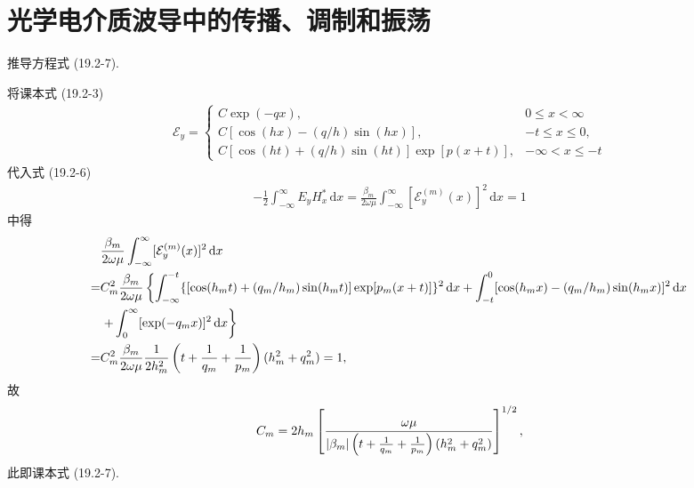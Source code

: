 \documentclass{note}
\begin{document}
\fi
\setcounter{chapter}{14}
\chapter{光学电介质波导中的传播、调制和振荡}
\begin{exe}
    推导方程式 (19.2-7).
\end{exe}
\begin{pf}
    将课本式 (19.2-3)
    \begin{align}
        \mathcal{E}_y=\left\{\begin{array}{ll}
            C\exp(-qx),&0\leq x<\infty\\
            C[\cos(hx)-(q/h)\sin(hx)],&-t\leq x\leq 0,\\
            C[\cos(ht)+(q/h)\sin(ht)]\exp[p(x+t)],&-\infty<x\leq-t
        \end{array}\right.
    \end{align}
    代入式 (19.2-6)
    \begin{align}
        -\frac{1}{2}\int_{-\infty}^{\infty}E_yH_x^*\,\mathrm{d}x=\frac{\beta_m}{2\omega\mu}\int_{-\infty}^{\infty}[\mathcal{E}_y^{(m)}(x)]^2\,\mathrm{d}x=1
    \end{align}
    中得
    \begin{align}
        \notag&\frac{\beta_m}{2\omega\mu}\int_{-\infty}^{\infty}[\mathcal{E}_y^{(m)}(x)]^2\,\mathrm{d}x\\
        \notag=&C_m^2\frac{\beta_m}{2\omega\mu}\left\{\int_{-\infty}^{-t}\{[\cos(h_mt)+(q_m/h_m)\sin(h_mt)]\exp[p_m(x+t)]\}^2\,\mathrm{d}x+\int_{-t}^0[\cos(h_mx)-(q_m/h_m)\sin(h_mx)]^2\,\mathrm{d}x\right.\\
        \notag&\left.+\int_0^{\infty}[\exp(-q_mx)]^2\,\mathrm{d}x\right\}\\
        \notag=&C_m^2\frac{\beta_m}{2\omega\mu}\frac{1}{2h_m^2}\left(t+\frac{1}{q_m}+\frac{1}{p_m}\right)(h_m^2+q_m^2)=1,
    \end{align}
    故
    \begin{align}
        C_m=2h_m\left[\frac{\omega\mu}{\left\lvert\beta_m\right\rvert\left(t+\frac{1}{q_m}+\frac{1}{p_m}\right)(h_m^2+q_m^2)}\right]^{1/2},
    \end{align}
    此即课本式 (19.2-7).
\end{pf}
\end{document}
